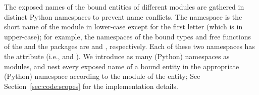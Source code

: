 \begin{table}[!]
  \caption{Module names and short names}
  \centering{}
  \label{tab:moduleName}
\end{table}

The exposed names of the bound entities of different modules are
gathered in distinct Python namespaces to prevent name conflicts. The
namespace is the short name of the module in lower-case except for the
first letter (which is in upper-case); for example, the namespaces of
the bound types and free functions of the
\iiDandiiiDGeometryKernelPackage{} and the
\iiDRegularizedBooleanSetOperationsPackage{} packages are
 and , respectively.  Each of these
two namespaces has the attribute  (i.e.,
 and
). We introduce as many (Python)
namespaces as modules, and nest every exposed name of a bound entity
in the appropriate (Python) namespace according to the module of the
entity; See Section~\ref{sec:code:scopes} for the implementation
details.

